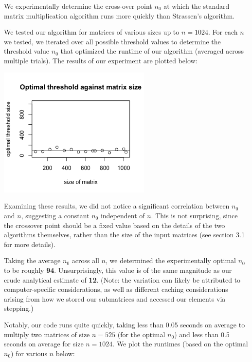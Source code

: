 \documentclass[a4paper]{article}
\begin{document}
We experimentally determine the cross-over point $n_0$ at which the standard matrix multiplication algorithm runs more quickly than Strassen's algorithm.

We tested our algorithm for matrices of various sizes up to $n=1024$. For each $n$ we tested, we iterated over all possible threshold values to determine the threshold value $n_0$ that optimized the runtime of our algorithm (averaged across multiple trials). The results of our experiment are plotted below: \\

\begin{centering}
\includegraphics[width=3in]{threshplot} \\
\end{centering}

Examining these results, we did not notice a significant correlation between $n_0$ and $n$, suggesting a constant $n_0$ independent of $n$. This is not surprising, since the crossover point should be a fixed value based on the details of the two algorithms themselves, rather than the size of the input matrices (see section 3.1 for more details).

Taking the average $n_0$ across all $n$, we determined the experimentally optimal $n_0$ to be roughly \textbf{94}. Unsurprisingly, this value is of the same magnitude as our crude analytical estimate of \textbf{12}. (Note: the variation can likely be attributed to computer-specific considerations, as well as different caching considerations arising from how we stored our submatrices and accessed our elements via stepping.)

Notably, our code runs quite quickly, taking less than 0.05 seconds on average to multiply two matrices of size $n = 525$ (for the optimal $n_0$) and less than 0.5 seconds on average for size $n = 1024$. We plot the runtimes (based on the optimal $n_0$) for various $n$ below: \\
\end{document}
